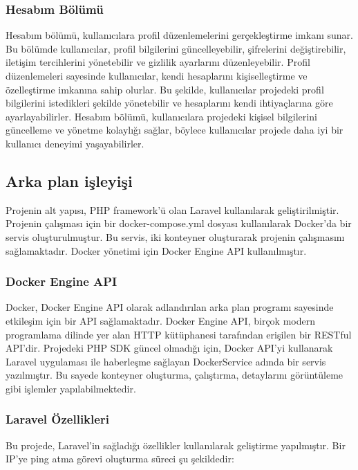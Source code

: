 \subsubsection{Hesabım Bölümü}
Hesabım bölümü, kullanıcılara profil düzenlemelerini gerçekleştirme imkanı sunar. Bu bölümde kullanıcılar, profil bilgilerini güncelleyebilir, şifrelerini değiştirebilir, iletişim tercihlerini yönetebilir ve gizlilik ayarlarını düzenleyebilir. Profil düzenlemeleri sayesinde kullanıcılar, kendi hesaplarını kişiselleştirme ve özelleştirme imkanına sahip olurlar. Bu şekilde, kullanıcılar projedeki profil bilgilerini istedikleri şekilde yönetebilir ve hesaplarını kendi ihtiyaçlarına göre ayarlayabilirler. Hesabım bölümü, kullanıcılara projedeki kişisel bilgilerini güncelleme ve yönetme kolaylığı sağlar, böylece kullanıcılar projede daha iyi bir kullanıcı deneyimi yaşayabilirler.

\subsection{Arka plan işleyişi}
Projenin alt yapısı, PHP framework'ü olan Laravel kullanılarak geliştirilmiştir. Projenin çalışması için bir docker-compose.yml dosyası kullanılarak Docker'da bir servis oluşturulmuştur. Bu servis, iki konteyner oluşturarak projenin çalışmasını sağlamaktadır. Docker yönetimi için Docker Engine API kullanılmıştır.

\subsubsection{Docker Engine API}

Docker, Docker Engine API olarak adlandırılan arka plan programı sayesinde etkileşim için bir API sağlamaktadır. Docker Engine API, birçok modern programlama dilinde yer alan HTTP kütüphanesi tarafından erişilen bir RESTful API'dir. Projedeki PHP SDK güncel olmadığı için, Docker API'yi kullanarak Laravel uygulaması ile haberleşme sağlayan DockerService adında bir servis yazılmıştır. Bu sayede konteyner oluşturma, çalıştırma, detaylarını görüntüleme gibi işlemler yapılabilmektedir.

\subsubsection{Laravel Özellikleri}

Bu projede, Laravel'in sağladığı özellikler kullanılarak geliştirme yapılmıştır. Bir IP'ye ping atma görevi oluşturma süreci şu şekildedir:

